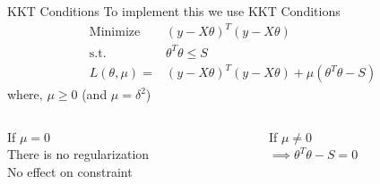 \documentclass{beamer}
\begin{document}
\begin{frame}{KKT Conditions}
To implement this we use KKT Conditions
\pause
\begin{align*}
\text{Minimize } & \left(y-X\theta\right)^T\left(y-X\theta\right) \\
\text{s.t. } & \theta ^T\theta \leq S \\
L\left(\theta, \mu \right) =& \left(y-X\theta\right)^T\left(y-X\theta\right) + \mu\left(\theta^T\theta - S\right)
\end{align*}
where, $\mu \geq 0$ (and $\mu = \delta^2$)\bigskip

\pause
\begin{columns}
\begin{column}{0.4\textwidth}
If $\mu = 0$ \\
There is no regularization \\
No effect on constraint
\end{column}
\pause
\begin{column}{0.4\textwidth}
If $\mu\neq 0$ \\
$\implies \theta^T\theta - S = 0$ 
\end{column}
\end{columns}
\end{frame}
\end{document}
